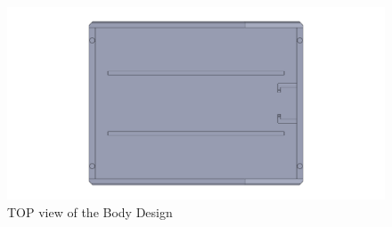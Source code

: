 \begin{figure}[h]
	\centering
	\includegraphics[width=1\linewidth]{Body_Design_1}
	\caption[TOP view of the Body Design]{TOP view of the Body Design}
	\label{fig:bodydesign1}
\end{figure}
